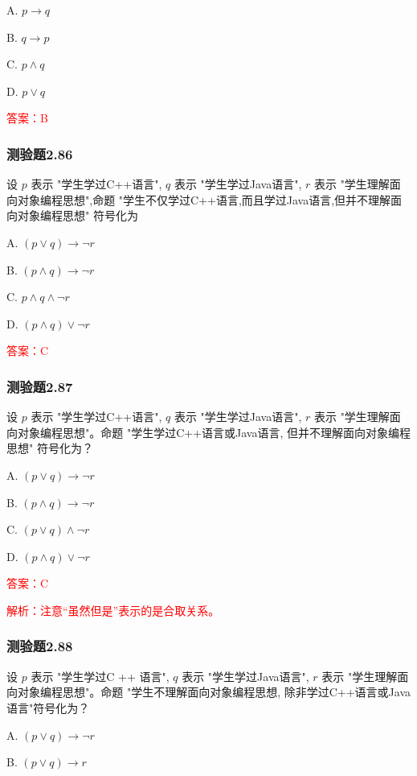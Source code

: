 \documentclass[UTF8, heading=true]{ctexart}
\begin{document}
A. $
p \rightarrow q
$

B. $
q \rightarrow p
$

C. $
p \wedge q
$

D. $
p \vee q
$

\textcolor{red}{答案：B}

\subsubsection{测验题2.86}

设 $p$ 表示 "学生学过C++语言", $q$ 表示 "学生学过Java语言", $r$ 表示 "学生理解面向对象编程思想",命题 "学生不仅学过C++语言,而且学过Java语言,但并不理解面向对象编程思想" 符号化为

A. $
(p \vee q) \rightarrow \neg r
$

B. $
(p \wedge q) \rightarrow \neg r
$

C. $
p \wedge q \wedge \neg r
$

D. $
(p \wedge q) \vee \neg r
$

\textcolor{red}{答案：C}



\subsubsection{测验题2.87}

设 $p$ 表示 "学生学过C++语言", $q$ 表示 "学生学过Java语言", $r$ 
表示 "学生理解面向对象编程思想"。命题 "学生学过C++语言或Java语言, 
但并不理解面向对象编程思想" 符号化为？

A. $(p \vee q) \rightarrow \neg r$

B. $(p \wedge q) \rightarrow \neg r$

C. $(p \vee q) \wedge \neg r$

D. $(p \wedge q) \vee \neg r$

\textcolor{red}{答案：C}

\textcolor{red}{解析：注意“虽然但是”表示的是合取关系。}

\subsubsection{测验题2.88}

设 $p$ 表示 "学生学过C ++ 语言", $q$ 表示 "学生学过Java语言", $r$ 表示 
"学生理解面向对象编程思想"。命题 "学生不理解面向对象编程思想,
除非学过C++语言或Java语言"符号化为？

A. $
(p \vee q) \rightarrow \neg r
$

B. $
(p \vee q) \rightarrow r
$
\end{document}
